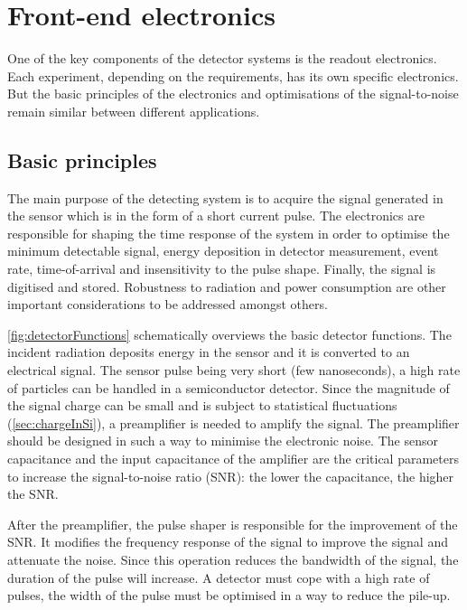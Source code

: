 \chapter{Front-end electronics}
\label{sec:FE_electronics}

One of the key components of the detector systems is the readout
electronics. Each experiment, depending on the requirements, has its
own specific electronics. But the basic principles of the electronics
and optimisations of the signal-to-noise remain similar between
different applications.

\section{Basic principles}

The main purpose of the detecting system is to acquire the signal
generated in the sensor which is in the form of a short current
pulse. The electronics are responsible for shaping the time response
of the system in order to optimise the minimum detectable signal,
energy deposition in detector measurement, event rate, time-of-arrival
and insensitivity to the pulse shape. Finally, the signal is digitised
and stored. Robustness to radiation and power consumption are other
important considerations to be addressed amongst others.

\cref{fig:detectorFunctions} schematically overviews the basic
detector functions. The incident radiation deposits energy in the
sensor and it is converted to an electrical signal. The sensor pulse
being very short (few nanoseconds), a high rate of particles can be
handled in a semiconductor detector. Since the magnitude of the signal
charge can be small and is subject to statistical fluctuations
(\cref{sec:chargeInSi}), a preamplifier is needed to amplify the
signal. The preamplifier should be designed in such a way to minimise
the electronic noise. The sensor capacitance and the input capacitance
of the amplifier are the critical parameters to increase the
signal-to-noise ratio (SNR): the lower the capacitance, the higher the
SNR.

After the preamplifier, the pulse shaper is responsible for the
improvement of the SNR. It modifies the frequency response of the
signal to improve the signal and attenuate the noise. Since this
operation reduces the bandwidth of the signal, the duration of the
pulse will increase. A detector must cope with a high rate of pulses,
the width of the pulse must be optimised in a way to reduce the
pile-up.

